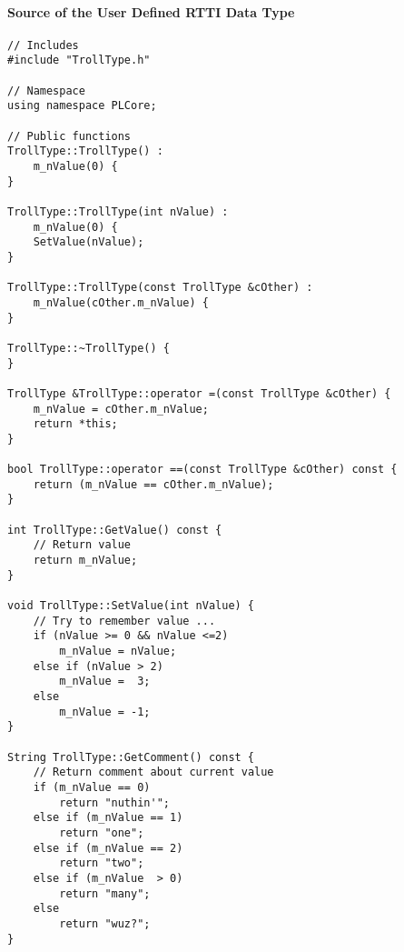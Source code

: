 \paragraph{Source of the User Defined RTTI Data Type}
\begin{lstlisting}[label=Code:UserDefinedRTTIDataTypeSource,caption={Source of the user defined RTTI data type}]
// Includes
#include "TrollType.h"

// Namespace
using namespace PLCore;

// Public functions
TrollType::TrollType() :
	m_nValue(0) {
}

TrollType::TrollType(int nValue) :
	m_nValue(0) {
	SetValue(nValue);
}

TrollType::TrollType(const TrollType &cOther) :
	m_nValue(cOther.m_nValue) {
}

TrollType::~TrollType() {
}

TrollType &TrollType::operator =(const TrollType &cOther) {
	m_nValue = cOther.m_nValue;
	return *this;
}

bool TrollType::operator ==(const TrollType &cOther) const {
	return (m_nValue == cOther.m_nValue);
}

int TrollType::GetValue() const {
	// Return value
	return m_nValue;
}

void TrollType::SetValue(int nValue) {
	// Try to remember value ...
	if (nValue >= 0 && nValue <=2)
		m_nValue = nValue;
	else if (nValue > 2)
		m_nValue =  3;
	else
		m_nValue = -1;
}

String TrollType::GetComment() const {
	// Return comment about current value
	if (m_nValue == 0)
		return "nuthin'";
	else if (m_nValue == 1)
		return "one";
	else if (m_nValue == 2)
		return "two";
	else if (m_nValue  > 0)
		return "many";
	else
		return "wuz?";
}
\end{lstlisting}
